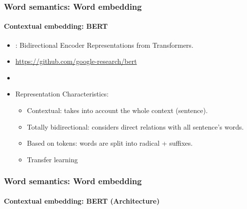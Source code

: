 \documentclass[xcolor=table]{beamer}
\begin{document}
\begin{frame}
\frametitle{Word semantics: Word embedding}
\framesubtitle{Contextual embedding: BERT}

\begin{minipage}{.71\textwidth}
	\begin{itemize}
		\item {}: Bidirectional Encoder Representations from Transformers.
		\item \url{https://github.com/google-research/bert}
		\item \cite{2019-devlin-al}
		\item Representation Characteristics:
		\begin{itemize}
			\item Contextual: takes into account the whole context (sentence).
			\item Totally bidirectional: considers direct relations with all sentence's words. 
			\item Based on tokens: words are split into radical + suffixes.
			\item Transfer learning
		\end{itemize}
	\end{itemize}
\end{minipage}
\begin{minipage}{.27\textwidth}
	\vspace{1.1cm}
\end{minipage}
	
\end{frame}

\begin{frame}
\frametitle{Word semantics: Word embedding}
\framesubtitle{Contextual embedding: BERT (Architecture)}
	
	\begin{center}
	\end{center}
	
\end{frame}
\end{document}
